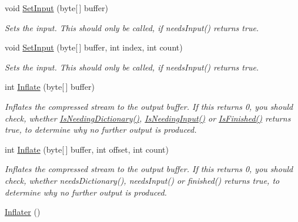 \begin{DoxyCompactItemize}
void \hyperlink{class_i_c_sharp_code_1_1_sharp_zip_lib_1_1_zip_1_1_compression_1_1_inflater_ab70e1ce75cf7f35e53d6ad810a0bcec2}{Set\+Input} (byte\mbox{[}$\,$\mbox{]} buffer)
\begin{DoxyCompactList}\small\item\em Sets the input. This should only be called, if needs\+Input() returns true. \end{DoxyCompactList}\item 
void \hyperlink{class_i_c_sharp_code_1_1_sharp_zip_lib_1_1_zip_1_1_compression_1_1_inflater_a9c0b4653fd574dc51dfa2975d9f9248a}{Set\+Input} (byte\mbox{[}$\,$\mbox{]} buffer, int index, int count)
\begin{DoxyCompactList}\small\item\em Sets the input. This should only be called, if needs\+Input() returns true. \end{DoxyCompactList}\item 
int \hyperlink{class_i_c_sharp_code_1_1_sharp_zip_lib_1_1_zip_1_1_compression_1_1_inflater_a73bfcbd5d20b4838bd28364fff12324e}{Inflate} (byte\mbox{[}$\,$\mbox{]} buffer)
\begin{DoxyCompactList}\small\item\em Inflates the compressed stream to the output buffer. If this returns 0, you should check, whether \hyperlink{class_i_c_sharp_code_1_1_sharp_zip_lib_1_1_zip_1_1_compression_1_1_inflater_a9db69836f41167ffd5e0d1dc5832594c}{Is\+Needing\+Dictionary()}, \hyperlink{class_i_c_sharp_code_1_1_sharp_zip_lib_1_1_zip_1_1_compression_1_1_inflater_a3033837c6e5987009c6bf51c4952a5fc}{Is\+Needing\+Input()} or \hyperlink{class_i_c_sharp_code_1_1_sharp_zip_lib_1_1_zip_1_1_compression_1_1_inflater_a0ade6f928ed3c7d1a9c8c9919c98141e}{Is\+Finished()} returns true, to determine why no further output is produced. \end{DoxyCompactList}\item 
int \hyperlink{class_i_c_sharp_code_1_1_sharp_zip_lib_1_1_zip_1_1_compression_1_1_inflater_aa77071f9ea123757cf11bae7b0fc4ea9}{Inflate} (byte\mbox{[}$\,$\mbox{]} buffer, int offset, int count)
\begin{DoxyCompactList}\small\item\em Inflates the compressed stream to the output buffer. If this returns 0, you should check, whether needs\+Dictionary(), needs\+Input() or finished() returns true, to determine why no further output is produced. \end{DoxyCompactList}\item 
\hyperlink{class_i_c_sharp_code_1_1_sharp_zip_lib_1_1_zip_1_1_compression_1_1_inflater_aa1518202b80f82414879742fd1bc5e44}{Inflater} ()

\end{DoxyCompactItemize}
